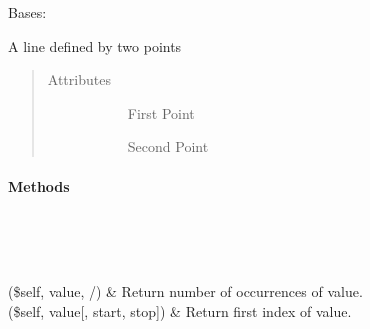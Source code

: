 \documentclass[letterpaper,10pt,english]{sphinxmanual}
\begin{document}
\begin{fulllineitems}
\label{\detokenize{dataTypes:dataTypes.Line}}
Bases: 

A line defined by two points
\begin{quote}\begin{description}
\item[{Attributes}] \leavevmode\begin{description}
\item[{{\hyperref[\detokenize{dataTypes:dataTypes.Line.point0}]{}}}] \leavevmode
First Point

\item[{{\hyperref[\detokenize{dataTypes:dataTypes.Line.point1}]{}}}] \leavevmode
Second Point

\end{description}

\end{description}\end{quote}
\paragraph{Methods}


\begin{savenotes}\sphinxatlongtablestart\begin{longtable}{}
\hline

\endfirsthead

%
{}\\
\hline

\endhead

\hline
{}\\
\endfoot

\endlastfoot

(\$self, value, /)
&
Return number of occurrences of value.
\\
\hline
{}(\$self, value{[}, start, stop{]})
&
Return first index of value.
\\
\hline
\end{longtable}\sphinxatlongtableend\end{savenotes}


\end{fulllineitems}
\end{document}
